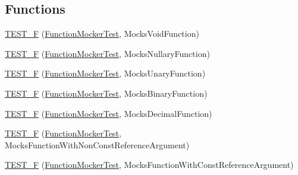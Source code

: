 \subsection*{Functions}
\begin{DoxyCompactItemize}
\item 
\mbox{\hyperlink{namespacetesting_1_1gmock__generated__function__mockers__test_aee64a5117451830331c321aecd10025f}{T\+E\+S\+T\+\_\+F}} (\mbox{\hyperlink{classtesting_1_1gmock__generated__function__mockers__test_1_1FunctionMockerTest}{Function\+Mocker\+Test}}, Mocks\+Void\+Function)
\item 
\mbox{\hyperlink{namespacetesting_1_1gmock__generated__function__mockers__test_a0a1348d6814b9bc02ad5b2ac46361ac0}{T\+E\+S\+T\+\_\+F}} (\mbox{\hyperlink{classtesting_1_1gmock__generated__function__mockers__test_1_1FunctionMockerTest}{Function\+Mocker\+Test}}, Mocks\+Nullary\+Function)
\item 
\mbox{\hyperlink{namespacetesting_1_1gmock__generated__function__mockers__test_a835348f70c0335c9213153f72138d12f}{T\+E\+S\+T\+\_\+F}} (\mbox{\hyperlink{classtesting_1_1gmock__generated__function__mockers__test_1_1FunctionMockerTest}{Function\+Mocker\+Test}}, Mocks\+Unary\+Function)
\item 
\mbox{\hyperlink{namespacetesting_1_1gmock__generated__function__mockers__test_aa8d2e25f60ad3ac49736ee90fb7ac190}{T\+E\+S\+T\+\_\+F}} (\mbox{\hyperlink{classtesting_1_1gmock__generated__function__mockers__test_1_1FunctionMockerTest}{Function\+Mocker\+Test}}, Mocks\+Binary\+Function)
\item 
\mbox{\hyperlink{namespacetesting_1_1gmock__generated__function__mockers__test_a279ba48bf6f937eecfc12530b9dde497}{T\+E\+S\+T\+\_\+F}} (\mbox{\hyperlink{classtesting_1_1gmock__generated__function__mockers__test_1_1FunctionMockerTest}{Function\+Mocker\+Test}}, Mocks\+Decimal\+Function)
\item 
\mbox{\hyperlink{namespacetesting_1_1gmock__generated__function__mockers__test_a852587f21316c0341b60b29d44cd61ea}{T\+E\+S\+T\+\_\+F}} (\mbox{\hyperlink{classtesting_1_1gmock__generated__function__mockers__test_1_1FunctionMockerTest}{Function\+Mocker\+Test}}, Mocks\+Function\+With\+Non\+Const\+Reference\+Argument)
\item 
\mbox{\hyperlink{namespacetesting_1_1gmock__generated__function__mockers__test_a5367aba117b37aff1ceb4be3d4732559}{T\+E\+S\+T\+\_\+F}} (\mbox{\hyperlink{classtesting_1_1gmock__generated__function__mockers__test_1_1FunctionMockerTest}{Function\+Mocker\+Test}}, Mocks\+Function\+With\+Const\+Reference\+Argument)

\end{DoxyCompactItemize}
